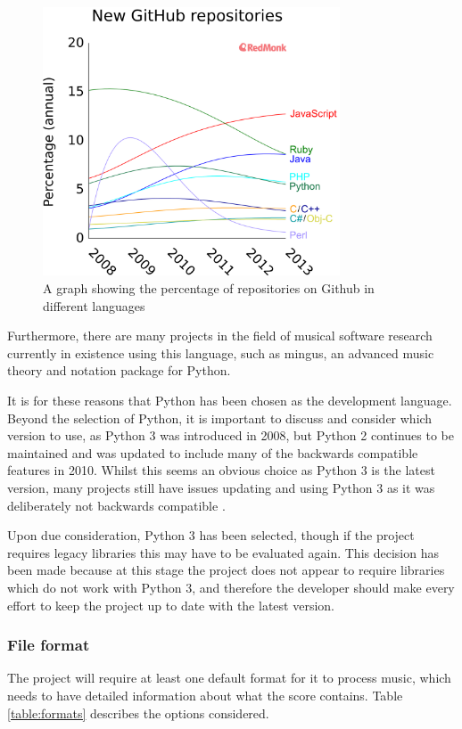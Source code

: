 \begin{figure}[h]
\centering
\includegraphics[width=250pt]{github-repos}
\caption{A graph showing the percentage of repositories on Github in different languages}	
\label{fig:graph}
\end{figure}

Furthermore, there are many projects in the field of musical software research currently in existence using this language, \parencite{pmus} such as mingus, an advanced music theory and notation package for Python.

It is for these reasons that Python has been chosen as the development language. Beyond the selection of Python, it is important to discuss and consider which version to use, as Python 3 was introduced in 2008, but Python 2 continues to be maintained and was updated to include many of the backwards compatible features in 2010. Whilst this seems an obvious choice as Python 3 is the latest version, many projects still have issues updating and using Python 3 as it was deliberately not backwards compatible \parencite{Foundation2}.

Upon due consideration, Python 3 has been selected, though if the project requires legacy libraries this may have to be evaluated again. This decision has been made because at this stage the project does not appear to require libraries which do not work with Python 3, and therefore the developer should make every effort to keep the project up to date with the latest version.

\subsubsection{File format}
The project will require at least one default format for it to process music, which needs to have detailed information about what the score contains. Table \ref{table:formats} describes the options considered.

